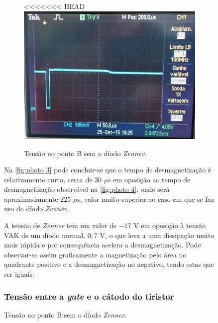 \documentclass[a4paper,11pt]{article}
\numberwithin{equation}{section}
\begin{document}
\begin{figure}[h]
\begin{figure}[h]
	\centering
<<<<<<< HEAD
	\includegraphics[keepaspectratio=true, scale=0.8]{img/fig7}
	\caption{Tensão no ponto B sem o díodo \textit{Zenner}.}
	\label{fig:photo 4}
	\vspace{-0.8em}
\end{figure}

Na \autoref{fig:photo 3} pode concluir-se que o tempo de desmagnetização é relativamente curto, cerca de $30$ $\mu$s em oposição ao tempo de desmagnetização observável na \autoref{fig:photo 4}, onde será aproximadamente $225$ $\mu$s, valor muito superior ao caso em que se faz uso do díodo \textit{Zenner}.

A tensão de \textit{Zenner} tem um valor de $-17$ V em oposição à tensão VAK de um díodo normal, $0,7$ V, o que leva a uma dissipação muito mais rápida e por consequência acelera a desmagnetização. Pode observar-se assim graficamente a magnetização pelo área no quadrante positivo e a desmagnetização no negativo, tendo estas que ser iguais.


\subsubsection{Tensão entre a \textit{gate} e o cátodo do tiristor}


\end{figure}
\end{document}
